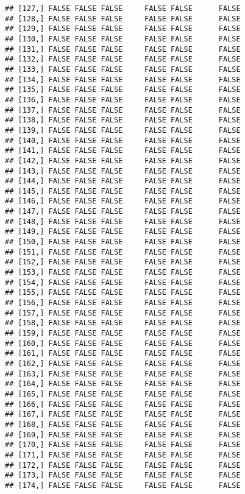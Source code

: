 \documentclass[
]{article}
\begin{document}
\begin{verbatim}
## [127,] FALSE FALSE FALSE     FALSE FALSE      FALSE
## [128,] FALSE FALSE FALSE     FALSE FALSE      FALSE
## [129,] FALSE FALSE FALSE     FALSE FALSE      FALSE
## [130,] FALSE FALSE FALSE     FALSE FALSE      FALSE
## [131,] FALSE FALSE FALSE     FALSE FALSE      FALSE
## [132,] FALSE FALSE FALSE     FALSE FALSE      FALSE
## [133,] FALSE FALSE FALSE     FALSE FALSE      FALSE
## [134,] FALSE FALSE FALSE     FALSE FALSE      FALSE
## [135,] FALSE FALSE FALSE     FALSE FALSE      FALSE
## [136,] FALSE FALSE FALSE     FALSE FALSE      FALSE
## [137,] FALSE FALSE FALSE     FALSE FALSE      FALSE
## [138,] FALSE FALSE FALSE     FALSE FALSE      FALSE
## [139,] FALSE FALSE FALSE     FALSE FALSE      FALSE
## [140,] FALSE FALSE FALSE     FALSE FALSE      FALSE
## [141,] FALSE FALSE FALSE     FALSE FALSE      FALSE
## [142,] FALSE FALSE FALSE     FALSE FALSE      FALSE
## [143,] FALSE FALSE FALSE     FALSE FALSE      FALSE
## [144,] FALSE FALSE FALSE     FALSE FALSE      FALSE
## [145,] FALSE FALSE FALSE     FALSE FALSE      FALSE
## [146,] FALSE FALSE FALSE     FALSE FALSE      FALSE
## [147,] FALSE FALSE FALSE     FALSE FALSE      FALSE
## [148,] FALSE FALSE FALSE     FALSE FALSE      FALSE
## [149,] FALSE FALSE FALSE     FALSE FALSE      FALSE
## [150,] FALSE FALSE FALSE     FALSE FALSE      FALSE
## [151,] FALSE FALSE FALSE     FALSE FALSE      FALSE
## [152,] FALSE FALSE FALSE     FALSE FALSE      FALSE
## [153,] FALSE FALSE FALSE     FALSE FALSE      FALSE
## [154,] FALSE FALSE FALSE     FALSE FALSE      FALSE
## [155,] FALSE FALSE FALSE     FALSE FALSE      FALSE
## [156,] FALSE FALSE FALSE     FALSE FALSE      FALSE
## [157,] FALSE FALSE FALSE     FALSE FALSE      FALSE
## [158,] FALSE FALSE FALSE     FALSE FALSE      FALSE
## [159,] FALSE FALSE FALSE     FALSE FALSE      FALSE
## [160,] FALSE FALSE FALSE     FALSE FALSE      FALSE
## [161,] FALSE FALSE FALSE     FALSE FALSE      FALSE
## [162,] FALSE FALSE FALSE     FALSE FALSE      FALSE
## [163,] FALSE FALSE FALSE     FALSE FALSE      FALSE
## [164,] FALSE FALSE FALSE     FALSE FALSE      FALSE
## [165,] FALSE FALSE FALSE     FALSE FALSE      FALSE
## [166,] FALSE FALSE FALSE     FALSE FALSE      FALSE
## [167,] FALSE FALSE FALSE     FALSE FALSE      FALSE
## [168,] FALSE FALSE FALSE     FALSE FALSE      FALSE
## [169,] FALSE FALSE FALSE     FALSE FALSE      FALSE
## [170,] FALSE FALSE FALSE     FALSE FALSE      FALSE
## [171,] FALSE FALSE FALSE     FALSE FALSE      FALSE
## [172,] FALSE FALSE FALSE     FALSE FALSE      FALSE
## [173,] FALSE FALSE FALSE     FALSE FALSE      FALSE
## [174,] FALSE FALSE FALSE     FALSE FALSE      FALSE

\end{verbatim}
\end{document}
